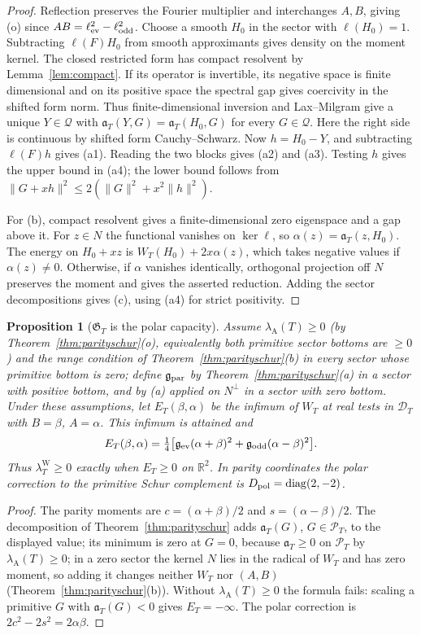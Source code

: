 \documentclass[10pt]{amsart}
\newtheorem{proposition}[theorem]{Proposition}
\theoremstyle{definition}
\theoremstyle{remark}
\newcommand{\R}{\mathbb R}
\newcommand{\PT}{\mathcal P_T}
\newcommand{\lamW}{\lambda^{\mathrm W}_T}
\newcommand{\lamA}{\lambda_{\mathrm A}(T)}
\begin{document}
\begin{proof}
Reflection preserves the Fourier multiplier and interchanges $A,B$,
giving (o) since $AB=\ell_{\rm ev}^2-\ell_{\rm odd}^2$. Choose
a smooth $H_0$ in the sector with $\ell(H_0)=1$. Subtracting
$\ell(F)H_0$ from smooth approximants gives density on the moment
kernel. The closed restricted form has compact resolvent by
Lemma~\ref{lem:compact}. If its operator is invertible, its negative
space is finite dimensional and on its positive space the spectral gap
gives coercivity in the shifted form norm. Thus finite-dimensional
inversion and Lax--Milgram give a unique $Y\in\mathcal Q$ with
$\mathfrak a_T(Y,G)=\mathfrak a_T(H_0,G)$ for every $G\in\mathcal Q$.
Here the right side is continuous by shifted form Cauchy--Schwarz.
Now $h=H_0-Y$, and subtracting $\ell(F)h$ gives (a1). Reading the
two blocks gives (a2) and (a3). Testing $h$ gives the upper bound
in (a4); the lower bound follows from
$\|G+xh\|^2\le2(\|G\|^2+x^2\|h\|^2)$.

For (b), compact resolvent gives a finite-dimensional zero eigenspace
and a gap above it. For $z\in N$ the functional vanishes on $\ker\ell$,
so $\alpha(z)=\mathfrak a_T(z,H_0)$. The energy on $H_0+xz$ is
$W_T(H_0)+2x\alpha(z)$, which takes negative values if $\alpha(z)\ne0$.
Otherwise, if $\alpha$ vanishes identically, orthogonal projection off
$N$ preserves the moment and gives the asserted reduction. Adding the
sector decompositions gives (c), using (a4) for strict positivity.
\end{proof}

\begin{proposition}[$\mathfrak G_T$ is the polar capacity]\label{prop:polarcap}
Assume $\lamA\ge0$ (by Theorem~\ref{thm:parityschur}(o), equivalently both primitive sector bottoms are
$\ge0$) and the range condition of Theorem~\ref{thm:parityschur}(b) in every sector whose primitive bottom is
zero; define $\mathfrak g_{\rm par}$ by Theorem~\ref{thm:parityschur}(a) in a sector with positive bottom, and by (a)
applied on $N^\perp$ in a sector with zero bottom. Under these assumptions,
let $E_T(\beta,\alpha)$ be the infimum of $W_T$ at real tests in
$\mathcal D_T$ with $B=\beta$, $A=\alpha$. This infimum is attained and
\[
 E_T(\beta,\alpha)=\tfrac14\bigl[\mathfrak g_{\rm ev}(\alpha+\beta)^2+
 \mathfrak g_{\rm odd}(\alpha-\beta)^2\bigr].
\]
Thus $\lamW\ge0$ exactly when $E_T\ge0$ on $\R^2$. In parity
coordinates the polar correction to the primitive Schur complement
is $D_{\rm pol}=\operatorname{diag}(2,-2)$.
\end{proposition}
\begin{proof}
The parity moments are $c=(\alpha+\beta)/2$ and $s=(\alpha-\beta)/2$.
The decomposition of Theorem~\ref{thm:parityschur} adds
$\mathfrak a_T(G)$, $G\in\PT$, to the displayed value; its minimum
is zero at $G=0$, because $\mathfrak a_T\ge0$ on $\PT$ by $\lamA\ge0$; in a zero sector the kernel $N$ lies in
the radical of $W_T$ and has zero moment, so adding it changes neither $W_T$ nor $(A,B)$
(Theorem~\ref{thm:parityschur}(b)). Without $\lamA\ge0$ the formula fails: scaling a primitive $G$ with
$\mathfrak a_T(G)<0$ gives $E_T=-\infty$. The polar correction is $2c^2-2s^2=2\alpha\beta$.
\end{proof}
\end{document}
